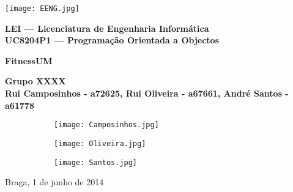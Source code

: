 \begin{titlepage}
\begin{center}

\begin{flushleft}
\texttt{[image: EENG.jpg]}\\
\end{flushleft}

\vspace{2cm}

\Large{\textbf{LEI --- Licenciatura de Engenharia Informática}}\\
\vspace{1cm}
\Large{\textbf{UC8204P1 --- Programação Orientada a Objectos}}\\

\vspace{2.5cm}

\Huge{\textbf{FitnessUM}} \\

\vspace{2cm}

\Large{\textbf{Grupo XXXX}}\\
\vspace{0.5cm}
\normalsize{\textbf{Rui Camposinhos - a72625, Rui Oliveira - a67661, André Santos - a61778}}\\
\vspace{0.5cm}
\begin{figure}[h]
\centering
\begin{subfigure}{.2\textwidth}
  \centering
  \texttt{[image: Camposinhos.jpg]}
\end{subfigure}
\begin{subfigure}{.2\textwidth}
  \centering
  \texttt{[image: Oliveira.jpg]}
\end{subfigure}
\begin{subfigure}{.2\textwidth}
  \centering
  \texttt{[image: Santos.jpg]}
\end{subfigure}
\end{figure}

\vspace{2cm}
Braga, 1 de junho de 2014

\end{center}

\end{titlepage}